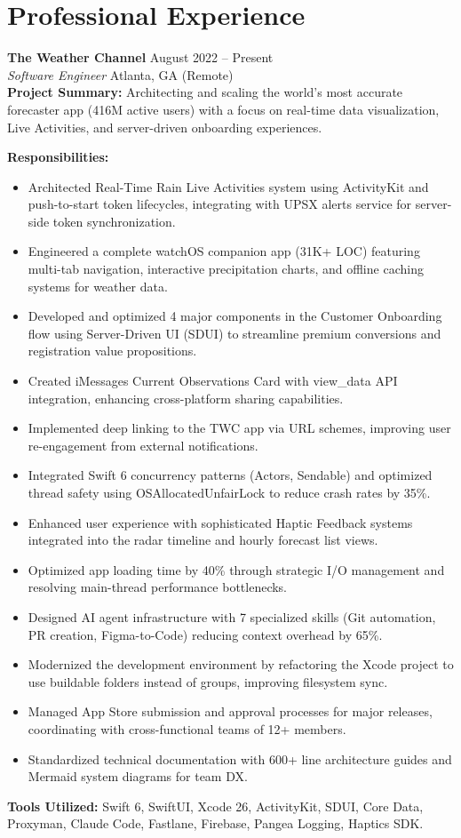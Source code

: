 \documentclass[letter,10pt]{article}
\newcommand{\role}[4]{
    \noindent\textbf{#1} \hfill #3 \\
    \textit{#2} \hfill #4 \\
}
\begin{document}
\section*{Professional Experience}

\role{The Weather Channel}{Software Engineer}{August 2022 -- Present}{Atlanta, GA (Remote)}
\noindent\textbf{Project Summary:} Architecting and scaling the world's most accurate forecaster app (416M active users) with a focus on real-time data visualization, Live Activities, and server-driven onboarding experiences.

\noindent\textbf{Responsibilities:}
\begin{itemize}[noitemsep, topsep=2pt]
    \item Architected Real-Time Rain Live Activities system using ActivityKit and push-to-start token lifecycles, integrating with UPSX alerts service for server-side token synchronization.
    \item Engineered a complete watchOS companion app (31K+ LOC) featuring multi-tab navigation, interactive precipitation charts, and offline caching systems for weather data.
    \item Developed and optimized 4 major components in the Customer Onboarding flow using Server-Driven UI (SDUI) to streamline premium conversions and registration value propositions.
    \item Created iMessages Current Observations Card with view\_data API integration, enhancing cross-platform sharing capabilities.
    \item Implemented deep linking to the TWC app via URL schemes, improving user re-engagement from external notifications.
    \item Integrated Swift 6 concurrency patterns (Actors, Sendable) and optimized thread safety using OSAllocatedUnfairLock to reduce crash rates by 35\%.
    \item Enhanced user experience with sophisticated Haptic Feedback systems integrated into the radar timeline and hourly forecast list views.
    \item Optimized app loading time by 40\% through strategic I/O management and resolving main-thread performance bottlenecks.
    \item Designed AI agent infrastructure with 7 specialized skills (Git automation, PR creation, Figma-to-Code) reducing context overhead by 65\%.
    \item Modernized the development environment by refactoring the Xcode project to use buildable folders instead of groups, improving filesystem sync.
    \item Managed App Store submission and approval processes for major releases, coordinating with cross-functional teams of 12+ members.
    \item Standardized technical documentation with 600+ line architecture guides and Mermaid system diagrams for team DX.
\end{itemize}
\noindent\textbf{Tools Utilized:} Swift 6, SwiftUI, Xcode 26, ActivityKit, SDUI, Core Data, Proxyman, Claude Code, Fastlane, Firebase, Pangea Logging, Haptics SDK.
\end{document}
